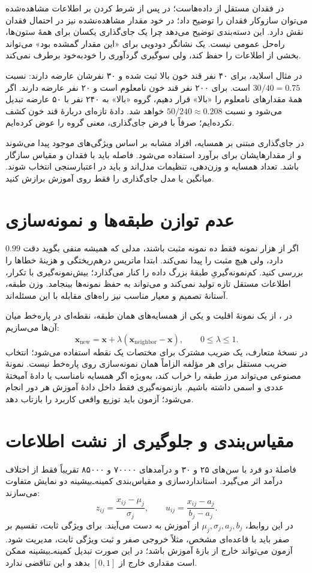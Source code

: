 \documentclass[12pt,a4paper,oneside]{report}
\newcounter{ex}[chapter]
\newenvironment{example}[1]{\refstepcounter{ex}\begin{tcolorbox}[breakable=false,title={مثال \thechapter.\arabic{ex} | #1},colframe=muted,colback=white]}{\end{tcolorbox}}
\begin{document}
در  فقدان مستقل از داده‌هاست؛ در  پس از شرط کردن بر اطلاعات مشاهده‌شده می‌توان سازوکار فقدان را توضیح داد؛ در  خود مقدار مشاهده‌نشده نیز در احتمال فقدان نقش دارد. این دسته‌بندی توضیح می‌دهد چرا یک جای‌گذاری یکسان برای همهٔ ستون‌ها، راه‌حل عمومی نیست. یک نشانگر دودویی برای «این مقدار گمشده بود» می‌تواند بخشی از اطلاعات را حفظ کند، ولی سوگیری گردآوری را خودبه‌خود برطرف نمی‌کند.

\begin{example}{جای‌گذاری می‌تواند رابطه را وارونه کند}
در مثال اسلاید، برای ۴۰ نفر قند خون بالا ثبت شده و ۳۰ نفرشان عارضه دارند: نسبت $30/40=0.75$ است. برای ۲۰۰ نفر قند خون نامعلوم است و ۲۰ نفر عارضه دارند. اگر همهٔ مقدارهای نامعلوم را «بالا» قرار دهیم، گروه «بالا» به ۲۴۰ نفر با ۵۰ عارضه تبدیل می‌شود و نسبت $50/240\approx0.208$ خواهد شد. دادهٔ تازه‌ای دربارهٔ قند خون کشف نکرده‌ایم؛ صرفاً با فرض جای‌گذاری، معنی گروه را عوض کرده‌ایم.
\end{example}

در جای‌گذاری مبتنی بر همسایه، افراد مشابه بر اساس ویژگی‌های موجود پیدا می‌شوند و از مقدارهایشان برای برآورد استفاده می‌شود. فاصله باید با فقدان و مقیاس سازگار باشد. تعداد همسایه و وزن‌دهی، تنظیمات مدل‌اند و باید در اعتبارسنجی انتخاب شوند. میانگین یا مدل جای‌گذاری را فقط روی آموزش برازش کنید.

\section{عدم توازن طبقه‌ها و نمونه‌سازی}
اگر از هزار نمونه فقط ده نمونه مثبت باشند، مدلی که همیشه منفی بگوید دقت $0.99$ دارد، ولی هیچ مثبت را پیدا نمی‌کند. ابتدا ماتریس درهم‌ریختگی و هزینهٔ خطاها را بررسی کنید. کم‌نمونه‌گیریِ طبقهٔ بزرگ داده را کنار می‌گذارد؛ بیش‌نمونه‌گیری با تکرار، اطلاعات مستقل تازه تولید نمی‌کند و می‌تواند به حفظ نمونه‌ها بینجامد. وزن طبقه، آستانهٔ تصمیم و معیار مناسب نیز راه‌های مقابله با این مسئله‌اند.

در ، از یک نمونهٔ اقلیت و یکی از همسایه‌های همان طبقه، نقطه‌ای در پاره‌خط میان آن‌ها می‌سازیم:
\[\mathbf x_{\mathrm{new}}=\mathbf x+\lambda(\mathbf x_{\mathrm{neighbor}}-\mathbf x),\qquad 0\le\lambda\le1.\]
در نسخهٔ متعارف، یک ضریب مشترک برای مختصات یک نقطه استفاده می‌شود؛ انتخاب ضریب مستقل برای هر مؤلفه الزاماً همان نمونه‌سازی روی پاره‌خط نیست. نمونهٔ مصنوعی می‌تواند مرز طبقه را خراب کند، به‌ویژه اگر همسایه نامناسب یا دادهٔ آمیختهٔ عددی و اسمی داشته باشیم. بازنمونه‌گیری فقط داخل دادهٔ آموزش هر دور انجام می‌شود؛ آزمون باید توزیع واقعی کاربرد را بازتاب دهد.

\section{مقیاس‌بندی و جلوگیری از نشت اطلاعات}
فاصلهٔ دو فرد با سن‌های ۲۵ و ۳۰ و درآمدهای ۷۰۰۰۰ و ۸۵۰۰۰ تقریباً فقط از اختلاف درآمد اثر می‌گیرد. استانداردسازی و مقیاس‌بندی کمینه‌ـ‌بیشینه دو نمایش متفاوت می‌سازند:
\[z_{ij}=\frac{x_{ij}-\mu_j}{\sigma_j},\qquad u_{ij}=\frac{x_{ij}-a_j}{b_j-a_j}.\]
در این روابط، $\mu_j,\sigma_j,a_j,b_j$ از آموزش به دست می‌آیند. برای ویژگی ثابت، تقسیم بر صفر باید با قاعده‌ای مشخص، مثلاً خروجی صفر و ثبت ویژگی ثابت، مدیریت شود. آزمون می‌تواند خارج از بازهٔ آموزش باشد؛ در این صورت تبدیل کمینه‌ـ‌بیشینه ممکن است مقداری خارج از $[0,1]$ بدهد و این تناقضی ندارد.
\end{document}
